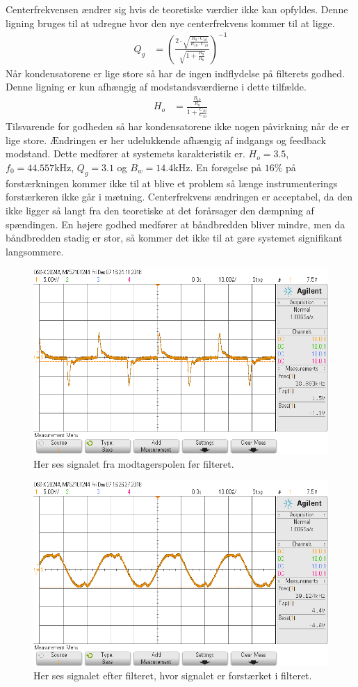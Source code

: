 Centerfrekvensen ændrer sig hvis de teoretiske værdier ikke kan opfyldes. Denne ligning bruges til at udregne hvor den nye centerfrekvens kommer til at ligge.
\begin{align}
	Q_g & = \left( \frac{2 \cdot \sqrt{\frac{R_9 \cdot C_{10}}{R_{10} \cdot C_{10}}}}{\sqrt{1+\frac{R_9}{R_8}}} \right)^{-1}
	\end{align}
Når kondensatorene er lige store så har de ingen indflydelse på filterets godhed. Denne ligning er kun afhængig af modstandsværdierne i dette tilfælde.
\begin{align}
	H_o & = \frac{\frac{R_{10}}{R_8}}{1+\frac{C_{10}}{C_{10}}}
\end{align}
Tilsvarende for godheden så har kondensatorene ikke nogen påvirkning når de er lige store.
Ændringen er her udelukkende afhængig af indgangs og feedback modstand.
Dette medfører at systemets karakteristik er. 
$H_o = 3.5$, $f_0 = 44.557 \si{\kilo\hertz}$, $Q_g = 3.1$ og $B_w = 14.4 \si{\kilo\hertz}$. 
En forøgelse på $16 \%$ på forstærkningen kommer ikke til at blive et problem så længe instrumenterings forstærkeren ikke går i mætning. 
Centerfrekvens ændringen er acceptabel, da den ikke ligger så langt fra den teoretiske at det forårsager den dæmpning af spændingen.
En højere godhed medfører at båndbredden bliver mindre, men da båndbredden stadig er stor, så kommer det ikke til at gøre systemet signifikant langsommere.
\begin{figure}[h!]
	\centering
	\includegraphics[width=1\textwidth]{billeder/filter_in_png.png}
	\caption{Her ses signalet fra modtagerspolen før filteret.}
	\label{fig:filter_in}
\end{figure}
\begin{figure}[h!]
	\centering
	\includegraphics[width=1\textwidth]{billeder/filter_out_png.png}
	\caption{Her ses signalet efter filteret, hvor signalet er forstærket i filteret.}
	\label{fig:filter_out}
\end{figure}